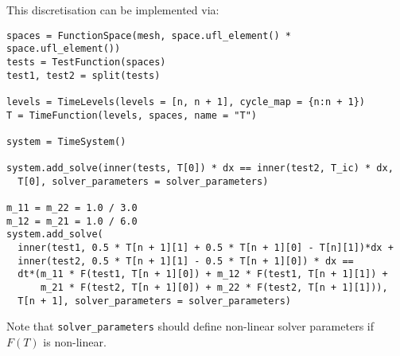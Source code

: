 \documentclass[a4paper]{book}
\begin{document}
This discretisation can be implemented via:
\begin{lstlisting}
spaces = FunctionSpace(mesh, space.ufl_element() * space.ufl_element())
tests = TestFunction(spaces)
test1, test2 = split(tests)

levels = TimeLevels(levels = [n, n + 1], cycle_map = {n:n + 1})
T = TimeFunction(levels, spaces, name = "T")

system = TimeSystem()

system.add_solve(inner(tests, T[0]) * dx == inner(test2, T_ic) * dx,
  T[0], solver_parameters = solver_parameters)

m_11 = m_22 = 1.0 / 3.0
m_12 = m_21 = 1.0 / 6.0
system.add_solve(
  inner(test1, 0.5 * T[n + 1][1] + 0.5 * T[n + 1][0] - T[n][1])*dx +
  inner(test2, 0.5 * T[n + 1][1] - 0.5 * T[n + 1][0]) * dx ==
  dt*(m_11 * F(test1, T[n + 1][0]) + m_12 * F(test1, T[n + 1][1]) +
      m_21 * F(test2, T[n + 1][0]) + m_22 * F(test2, T[n + 1][1])),
  T[n + 1], solver_parameters = solver_parameters)
\end{lstlisting}
Note that \verb+solver_parameters+ should define non-linear solver parameters if
$F(T)$ is non-linear.



\end{document}
